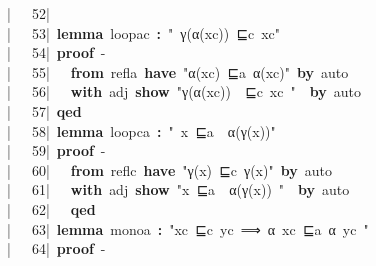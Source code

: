 \documentclass{article}
\newcommand{\syntaxKEYWORDA}[1]{\textcolor[rgb]{0.0,0.4,0.6}{\textbf{#1}}}
\newcommand{\syntaxKEYWORDC}[1]{\textcolor[rgb]{0.0,0.6,1.0}{\textbf{#1}}}
\newcommand{\syntaxLITERALA}[1]{\textcolor[rgb]{1.0,0.0,0.8}{#1}}
\newcommand{\syntaxOPERATOR}[1]{\textcolor[rgb]{0.0,0.0,0.0}{\textbf{#1}}}
\newcommand{\syntaxKEYWORDA}[1]{\textcolor[rgb]{0.0,0.4,0.6}{\textbf{#1}}}
\newcommand{\syntaxKEYWORDC}[1]{\textcolor[rgb]{0.0,0.6,1.0}{\textbf{#1}}}
\newcommand{\syntaxLITERALA}[1]{\textcolor[rgb]{1.0,0.0,0.8}{#1}}
\newcommand{\syntaxOPERATOR}[1]{\textcolor[rgb]{0.0,0.0,0.0}{\textbf{#1}}}
\newcommand{\syntaxKEYWORDA}[1]{\textcolor[rgb]{0.0,0.4,0.6}{\textbf{#1}}}
\newcommand{\syntaxKEYWORDC}[1]{\textcolor[rgb]{0.0,0.6,1.0}{\textbf{#1}}}
\newcommand{\syntaxLITERALA}[1]{\textcolor[rgb]{1.0,0.0,0.8}{#1}}
\newcommand{\syntaxOPERATOR}[1]{\textcolor[rgb]{0.0,0.0,0.0}{\textbf{#1}}}
\newcommand{\syntaxKEYWORDA}[1]{\textcolor[rgb]{0.0,0.4,0.6}{#1}}
\newcommand{\syntaxKEYWORDC}[1]{\textcolor[rgb]{0.0,0.6,1.0}{#1}}
\newcommand{\syntaxLITERALA}[1]{\textcolor[rgb]{1.0,0.0,0.8}{\textbf{#1}}}
\newcommand{\syntaxOPERATOR}[1]{\textcolor[rgb]{0.0,0.0,0.0}{#1}}
\newcommand{\syntaxKEYWORDA}[1]{\textcolor[rgb]{0.0,0.4,0.6}{\textbf{#1}}}
\newcommand{\syntaxKEYWORDC}[1]{\textcolor[rgb]{0.0,0.6,1.0}{\textbf{#1}}}
\newcommand{\syntaxLITERALA}[1]{\textcolor[rgb]{1.0,0.0,0.8}{#1}}
\newcommand{\syntaxOPERATOR}[1]{\textcolor[rgb]{0.0,0.0,0.0}{\textbf{#1}}}
\newcommand{\syntaxKEYWORDA}[1]{\textcolor[rgb]{0.0,0.4,0.6}{\textbf{#1}}}
\newcommand{\syntaxKEYWORDC}[1]{\textcolor[rgb]{0.0,0.6,1.0}{\textbf{#1}}}
\newcommand{\syntaxLITERALA}[1]{\textcolor[rgb]{1.0,0.0,0.8}{#1}}
\newcommand{\syntaxOPERATOR}[1]{\textcolor[rgb]{0.0,0.0,0.0}{\textbf{#1}}}
\newcommand{\syntaxKEYWORDA}[1]{\textcolor[rgb]{0.0,0.0,0.0}{#1}}
\newcommand{\syntaxKEYWORDC}[1]{\textcolor[rgb]{0.0,0.0,0.0}{#1}}
\newcommand{\gutter}[1]{\textcolor[rgb]{0,0,0}{{|}#1}}
\newcommand{\gutterH}[1]{\textcolor[rgb]{1,0,0}{{|}#1}}
\begin{document}
\gutter{\ \ \ 52{|}\ }\hspace*{\fill}\\
\gutter{\ \ \ 53{|}\ }\syntaxKEYWORDA{lemma}{\ }loopac{\ }\syntaxOPERATOR{:}{\ }\syntaxLITERALA{"{\ }γ(α(xc)){\ }⊑c{\ }xc"}\hspace*{\fill}\\
\gutter{\ \ \ 54{|}\ }\syntaxKEYWORDA{proof}{\ }{-}{\ }\hspace*{\fill}\\
\gutterH{\ \ \ 55{|}\ }{\ }{\ }\syntaxKEYWORDA{from}{\ }refla{\ }\syntaxKEYWORDA{have}{\ }\syntaxLITERALA{"α(xc){\ }⊑a{\ }α(xc)"}{\ }\syntaxKEYWORDA{by}{\ }auto\hspace*{\fill}\\
\gutter{\ \ \ 56{|}\ }{\ }{\ }\syntaxKEYWORDA{with}{\ }adj{\ }\syntaxKEYWORDC{show}{\ }\syntaxLITERALA{"γ(α(xc)){\ }{\ }⊑c{\ }xc{\ }"}{\ }{\ }\syntaxKEYWORDA{by}{\ }auto\hspace*{\fill}\\
\gutter{\ \ \ 57{|}\ }\syntaxKEYWORDA{qed}\hspace*{\fill}\\
\gutter{\ \ \ 58{|}\ }\syntaxKEYWORDA{lemma}{\ }loopca{\ }\syntaxOPERATOR{:}{\ }\syntaxLITERALA{"{\ }x{\ }⊑a{\ }{\ }α(γ(x))"}\hspace*{\fill}\\
\gutter{\ \ \ 59{|}\ }\syntaxKEYWORDA{proof}{\ }{-}{\ }\hspace*{\fill}\\
\gutterH{\ \ \ 60{|}\ }{\ }{\ }\syntaxKEYWORDA{from}{\ }reflc{\ }\syntaxKEYWORDA{have}{\ }\syntaxLITERALA{"γ(x){\ }⊑c{\ }γ(x)"}{\ }\syntaxKEYWORDA{by}{\ }auto\hspace*{\fill}\\
\gutter{\ \ \ 61{|}\ }{\ }{\ }\syntaxKEYWORDA{with}{\ }adj{\ }\syntaxKEYWORDC{show}{\ }\syntaxLITERALA{"x{\ }⊑a{\ }{\ }α(γ(x)){\ }"}{\ }{\ }\syntaxKEYWORDA{by}{\ }auto\hspace*{\fill}\\
\gutter{\ \ \ 62{|}\ }{\ }{\ }\syntaxKEYWORDA{qed}\hspace*{\fill}\\
\gutter{\ \ \ 63{|}\ }\syntaxKEYWORDA{lemma}{\ }monoa{\ }\syntaxOPERATOR{:}{\ }\syntaxLITERALA{"xc{\ }⊑c{\ }yc{\ }⟹{\ }α{\ }xc{\ }⊑a{\ }α{\ }yc{\ }"}\hspace*{\fill}\\
\gutter{\ \ \ 64{|}\ }\syntaxKEYWORDA{proof}{\ }{-}\hspace*{\fill}\\
\end{document}
